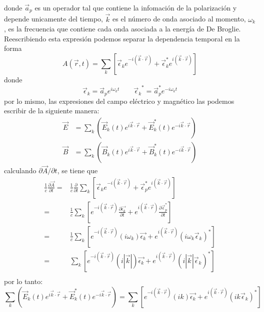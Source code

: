 donde $\vec{a}_{p}$ es un operador tal que contiene la infomación de la polarización y depende unicamente del tiempo, $\vec{k}$ es el número de onda asociado al momento, $\omega_k$, es la frecuencia 
que contiene cada onda asociada a la energía de De Broglie. Reescribiendo esta expresión podemos separar la dependencia temporal en la forma
\begin{equation*}
    A(\vec{r},t) =\sum_k \left[ \vec{\epsilon}_{k} e^{-i\left(\vec{k}\cdot \vec{r}\right)}+\vec{\epsilon}_{k}^* e^{i\left(\vec{k}\cdot \vec{r}\right)}\right]
\end{equation*}
donde 
\begin{equation*}
    \vec{\epsilon}_k= \vec{a}_{p}  e^{i\omega_k t} \qquad {\vec{\epsilon}_k}^*= \vec{a}^*_{p}  e^{-i\omega_k t}
\end{equation*}
por lo mismo, las expresiones del campo eléctrico y magnético las podemos escribir de la siguiente manera:
\begin{align*}
    \vec{E}&=\sum_k \left(\vec{E}_k(t)e^{i\vec{k}\cdot \vec{r}}+\vec{E}_k^*(t)e^{-i\vec{k}\cdot \vec{r}}\right)\\
    \vec{B}&=\sum_k \left(\vec{B}_k(t)e^{i\vec{k}\cdot \vec{r}}+\vec{B}_k^*(t)e^{-i\vec{k}\cdot \vec{r}}\right)
\end{align*}
calculando $\partial \vec{A}/\partial t$, se tiene que
\begin{align*}
    \frac{1}{c}\frac{\partial \vec{A}}{\partial t} =&\frac{1}{c}\frac{\partial}{\partial t}\sum_k\left[\vec{\epsilon}_k e^{-i\left(\vec{k}\cdot \vec{r}\right)}+\vec{\epsilon}_{p}^* e^{i\left(\vec{k}\cdot \vec{r}\right)}\right]\\
    =& \frac{1}{c}\sum_k\left[ e^{-i\left(\vec{k}\cdot \vec{r}\right)}\frac{\partial \vec{\epsilon_k}}{\partial t}+ e^{i\left(\vec{k}\cdot \vec{r}\right) }\frac{\partial \vec{\epsilon}_{p}^*}{\partial t}\right]\\
    =& \frac{1}{c}\sum_k\left[ e^{-i\left(\vec{k}\cdot \vec{r}\right)}(i\omega_k)\vec{\epsilon_k}+ e^{i\left(\vec{k}\cdot \vec{r}\right) }(i\omega_k \vec{\epsilon}_k)^*\right]\\
    =&\sum_k\left[ e^{-i\left(\vec{k}\cdot \vec{r}\right)}(i|\vec{k}|)\vec{\epsilon_k}+ e^{i\left(\vec{k}\cdot \vec{r}\right) }(i|\vec{k}| \vec{\epsilon}_k)^*\right]\\
\end{align*}
por lo tanto:
\begin{equation*}
    \sum_k \left(\vec{E}_k(t)e^{i\vec{k}\cdot \vec{r}}+\vec{E}_k^*(t)e^{-i\vec{k}\cdot \vec{r}}\right)=\sum_k\left[ e^{-i\left(\vec{k}\cdot \vec{r}\right)}(ik)\vec{\epsilon_k}+ e^{i\left(\vec{k}\cdot \vec{r}\right) }(ik \vec{\epsilon}_k)^*\right]
\end{equation*}
